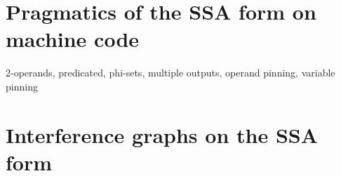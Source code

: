 \section{Pragmatics of the SSA form on machine code}

2-operands, predicated, phi-sets, multiple outputs, operand pinning, variable
pinning

\section{Interference graphs on the SSA form}



